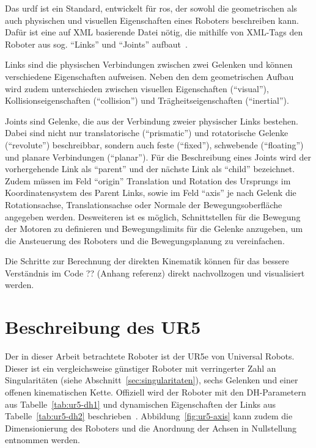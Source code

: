 Das \ac{urdf} ist ein Standard, entwickelt für \ac{ros}, der sowohl die geometrischen als auch physischen und visuellen Eigenschaften eines Roboters beschreiben kann.
Dafür ist eine auf XML basierende Datei nötig, die mithilfe von XML-Tags den Roboter aus sog. \enquote{Links} und \enquote{Joints} aufbaut~\cite{ros.orgUrdfXMLModel}.

Links sind die physischen Verbindungen zwischen zwei Gelenken und können verschiedene Eigenschaften aufweisen.
Neben den dem geometrischen Aufbau wird zudem unterschieden zwischen visuellen Eigenschaften (\enquote{visual}), Kollisionseigenschaften (\enquote{collision}) und Trägheitseigenschaften (\enquote{inertial}).

Joints sind Gelenke, die aus der Verbindung zweier physischer Links bestehen.
Dabei sind nicht nur translatorische (\enquote{prismatic}) und rotatorische Gelenke (\enquote{revolute}) beschreibbar, sondern auch feste (\enquote{fixed}), schwebende (\enquote{floating}) und planare Verbindungen (\enquote{planar}).
Für die Beschreibung eines Joints wird der vorhergehende Link als \enquote{parent} und der nächste Link als \enquote{child} bezeichnet.
Zudem müssen im Feld \enquote{origin} Translation und Rotation des Ursprungs im Koordinatensystem des Parent Links, sowie im Feld \enquote{axis} je nach Gelenk die Rotationsachse, Translationsachse oder Normale der Bewegungsoberfläche angegeben werden.
Desweiteren ist es möglich, Schnittstellen für die Bewegung der Motoren zu definieren und Bewegungslimits für die Gelenke anzugeben, um die Ansteuerung des Roboters und die Bewegungsplanung zu vereinfachen.

Die Schritte zur Berechnung der direkten Kinematik können für das bessere Verständnis im Code ?? (Anhang referenz) direkt nachvollzogen und visualisiert werden.


\section{Beschreibung des UR5}\label{sec:ur5-in-dh}
Der in dieser Arbeit betrachtete Roboter ist der UR5e von Universal Robots.
Dieser ist ein vergleichsweise günstiger Roboter mit verringerter Zahl an Singularitäten (siehe Abschnitt~\ref{sec:singularitaten}), sechs Gelenken und einer offenen kinematischen Kette.
Offiziell wird der Roboter mit den DH-Parametern aus Tabelle~\ref{tab:ur5-dh1} und dynamischen Eigenschaften der Links aus Tabelle~\ref{tab:ur5-dh2} beschrieben~\cite{universalrobotsUniversalRobotsDH}.
Abbildung~\ref{fig:ur5-axis} kann zudem die Dimensionierung des Roboters und die Anordnung der Achsen in Nullstellung entnommen werden.

